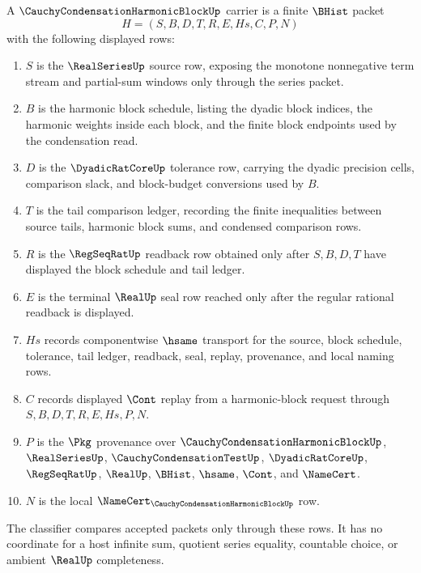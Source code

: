 \begin{definition}
\label{def:cauchy-condensation-harmonic-block-carrier}
A $\CauchyCondensationHarmonicBlockUp$ carrier is a finite $\BHist$ packet
$$
H=(S,B,D,T,R,E,Hs,C,P,N)
$$
with the following displayed rows:
\begin{enumerate}
\item $S$ is the $\RealSeriesUp$ source row, exposing the monotone nonnegative term stream and partial-sum windows only through the series packet.
\item $B$ is the harmonic block schedule, listing the dyadic block indices, the harmonic weights inside each block, and the finite block endpoints used by the condensation read.
\item $D$ is the $\DyadicRatCoreUp$ tolerance row, carrying the dyadic precision cells, comparison slack, and block-budget conversions used by $B$.
\item $T$ is the tail comparison ledger, recording the finite inequalities between source tails, harmonic block sums, and condensed comparison rows.
\item $R$ is the $\RegSeqRatUp$ readback row obtained only after $S,B,D,T$ have displayed the block schedule and tail ledger.
\item $E$ is the terminal $\RealUp$ seal row reached only after the regular rational readback is displayed.
\item $Hs$ records componentwise $\hsame$ transport for the source, block schedule, tolerance, tail ledger, readback, seal, replay, provenance, and local naming rows.
\item $C$ records displayed $\Cont$ replay from a harmonic-block request through $S,B,D,T,R,E,Hs,P,N$.
\item $P$ is the $\Pkg$ provenance over $\CauchyCondensationHarmonicBlockUp$, $\RealSeriesUp$, $\CauchyCondensationTestUp$, $\DyadicRatCoreUp$, $\RegSeqRatUp$, $\RealUp$, $\BHist$, $\hsame$, $\Cont$, and $\NameCert$.
\item $N$ is the local $\NameCert_{\CauchyCondensationHarmonicBlockUp}$ row.
\end{enumerate}
The classifier compares accepted packets only through these rows. It has no coordinate for a host infinite sum, quotient series equality, countable choice, or ambient $\RealUp$ completeness.
\end{definition}

